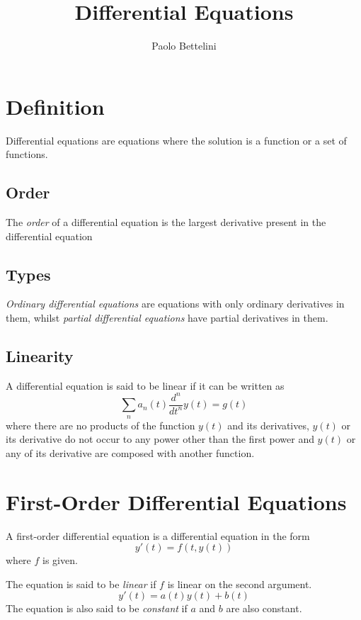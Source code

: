 \documentclass{article}
\title{Differential Equations}
\author{Paolo Bettelini}
\date{}
\begin{document}
\maketitle
\tableofcontents
\pagebreak

\section{Definition}

Differential equations are equations where the solution is a function
or a set of functions.

\subsection{Order}

The \textit{order} of a differential equation is the largest derivative present in the
differential equation

\subsection{Types}

\textit{Ordinary differential equations} are equations with only
ordinary derivatives in them, whilst \textit{partial differential equations}
have partial derivatives in them.

\subsection{Linearity}

A differential equation is said to be linear if it can be written as
\[
    \sum_n a_n(t) \frac{d^n}{dt^n}y(t)=g(t)
\]
where there are no products of the function \(y(t)\) and its derivatives,
\(y(t)\) or its derivative do not occur to any power other than the first power
and \(y(t)\) or any of its derivative are composed with another function.

\section{First-Order Differential Equations}

A first-order differential equation is a differential equation in the form
\[
    y'(t)=f(t,y(t))
\]
where \(f\) is given.

The equation is said to be \textit{linear}
if \(f\) is linear on the second argument.
\[
    y'(t)=a(t)y(t) + b(t)
\]
The equation is also said to be \textit{constant}
if \(a\) and \(b\) are also constant.
\end{document}

